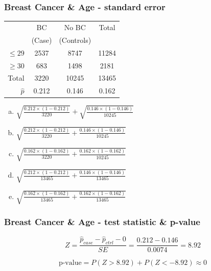 \documentclass[11pt,containsverbatim,handout,xcolor=xelatex,dvipsnames,table]{beamer}
\newcommand{\solnMult}[1]{#1}
\begin{document}
\begin{frame}
\frametitle{Breast Cancer \& Age - standard error}

{
{\footnotesize
\begin{center}
\begin{tabular}{r|c|c|c}
         & BC  & No BC & Total           \\
         & (Case)          & (Controls)       &                 \\
\hline
$\le 29$ & {2537} & {8747}  & {11284}\\
$\ge 30$ & {683}  & {1498}  & {2181} \\
\hline
Total    &{3220} &{10245} & {13465}\\
\hline
$\hat{p}$ & 0.212	& 0.146	& 0.162 \\
\end{tabular}
\end{center}
}
}

{\small
\begin{enumerate}[(a)]
\item $ \sqrt{ \frac{0.212 \times (1-0.212)}{3220}} + \sqrt{ \frac{0.146 \times (1-0.146)}{10245} }$
\item $ \sqrt{ \frac{0.212 \times (1-0.212)}{3220} + \frac{0.146 \times (1-0.146)}{10245} }$
\item \solnMult{ $ \sqrt{ \frac{0.162 \times (1-0.162)}{3220} + \frac{0.162 \times (1-0.162)}{10245} }$ } 
\item $ \sqrt{ \frac{0.212 \times (1-0.212)}{13465} + \frac{0.146 \times (1-0.146)}{13465} }$
\item $ \sqrt{ \frac{0.162 \times (1-0.162)}{13465} + \frac{0.162 \times (1-0.162)}{13465} }$
\end{enumerate}
}

\end{frame}


\begin{frame}
\frametitle{Breast Cancer \& Age - test statistic \& p-value}

\[ Z = \frac{\hat{p}_{case}-\hat{p}_{ctrl} - 0}{SE} = \frac{0.212 - 0.146}{0.0074} = 8.92 \]

\pause

\[ \text{p-value} = P(Z > 8.92)+P(Z<-8.92) \approx 0 \]

\end{frame}
\end{document}
